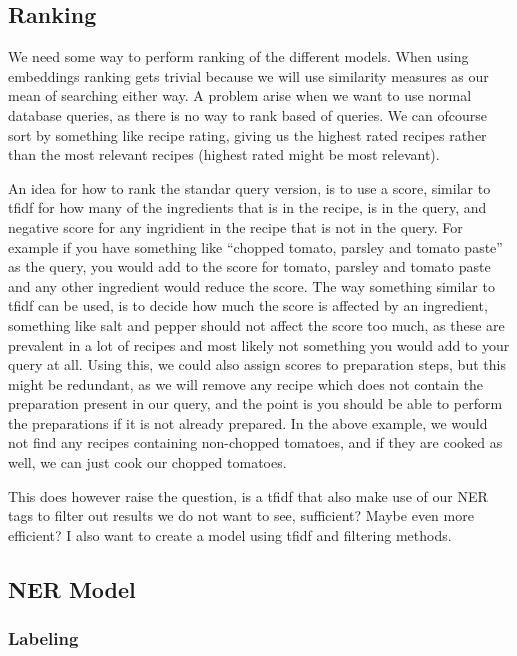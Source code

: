 \documentclass[11pt]{article}
\begin{document}
\subsection{Ranking}
We need some way to perform ranking of the different models.
When using embeddings ranking gets trivial because we will use similarity
measures as our mean of searching either way.
A problem arise when we want to use normal database queries, as there is no way
to rank based of queries.
We can ofcourse sort by something like recipe rating, giving us the highest
rated recipes rather than the most relevant recipes (highest rated might be most
relevant).

An idea for how to rank the standar query version, is to use a score, similar to
tfidf for how many of the ingredients that is in the recipe, is in the query,
and negative score for any ingridient in the recipe that is not in the query.
For example if you have something like ``chopped tomato, parsley and tomato
paste'' as the query, you would add to the score for tomato, parsley and tomato
paste and any other ingredient would reduce the score.
The way something similar to tfidf can be used, is to decide how much the score
is affected by an ingredient, something like salt and pepper should not affect
the score too much, as these are prevalent in a lot of recipes and most likely
not something you would add to your query at all.
Using this, we could also assign scores to preparation steps, but this might be
redundant, as we will remove any recipe which does not contain the preparation
present in our query, and the point is you should be able to perform the
preparations if it is not already prepared.
In the above example, we would not find any recipes containing non-chopped
tomatoes, and if they are cooked as well, we can just cook our chopped tomatoes.

This does however raise the question, is a tfidf that also make use of our NER
tags to filter out results we do not want to see, sufficient? Maybe even more
efficient?
I also want to create a model using tfidf and filtering methods.
\subsection{NER Model}
\subsubsection{Labeling}
\end{document}
